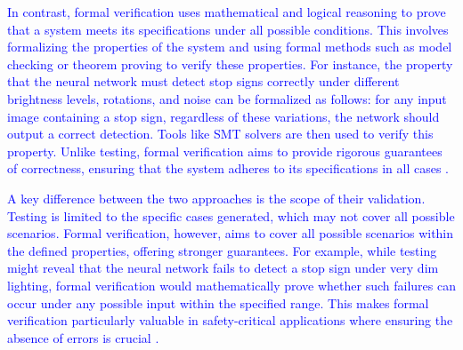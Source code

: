 \textcolor{blue}{In contrast, formal verification uses mathematical and logical reasoning to prove that a system meets its specifications under all possible conditions. This involves formalizing the properties of the system and using formal methods such as model checking or theorem proving to verify these properties. For instance, the property that the neural network must detect stop signs correctly under different brightness levels, rotations, and noise can be formalized as follows: for any input image containing a stop sign, regardless of these variations, the network should output a correct detection. Tools like SMT solvers are then used to verify this property. Unlike testing, formal verification aims to provide rigorous guarantees of correctness, ensuring that the system adheres to its specifications in all cases \cite{DeepMind2023, Albarghouthi}.}

\textcolor{blue}{A key difference between the two approaches is the scope of their validation. Testing is limited to the specific cases generated, which may not cover all possible scenarios. Formal verification, however, aims to cover all possible scenarios within the defined properties, offering stronger guarantees. For example, while testing might reveal that the neural network fails to detect a stop sign under very dim lighting, formal verification would mathematically prove whether such failures can occur under any possible input within the specified range. This makes formal verification particularly valuable in safety-critical applications where ensuring the absence of errors is crucial \cite{Urban2021}.}


